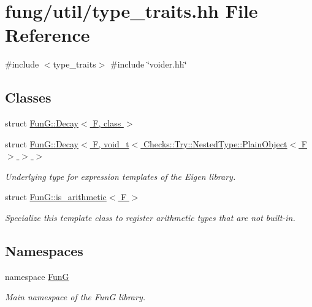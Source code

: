 \hypertarget{type__traits_8hh}{\section{fung/util/type\-\_\-traits.hh \-File \-Reference}
\label{type__traits_8hh}
}
{\ttfamily \#include $<$type\-\_\-traits$>$}\*
{\ttfamily \#include \char`\"{}voider.\-hh\char`\"{}}\*
\subsection*{\-Classes}
\begin{DoxyCompactItemize}
\item 
struct \hyperlink{structFunG_1_1Decay}{\-Fun\-G\-::\-Decay$<$ F, class $>$}
\item 
struct \hyperlink{structFunG_1_1Decay_3_01F_00_01void__t_3_01Checks_1_1Try_1_1NestedType_1_1PlainObject_3_01F_01_4_01_4_01_4}{\-Fun\-G\-::\-Decay$<$ F, void\-\_\-t$<$ Checks\-::\-Try\-::\-Nested\-Type\-::\-Plain\-Object$<$ F $>$ $>$ $>$}
\begin{DoxyCompactList}\small\item\em \-Underlying type for expression templates of the \-Eigen library. \end{DoxyCompactList}\item 
struct \hyperlink{structFunG_1_1is__arithmetic}{\-Fun\-G\-::is\-\_\-arithmetic$<$ F $>$}
\begin{DoxyCompactList}\small\item\em \-Specialize this template class to register arithmetic types that are not built-\/in. \end{DoxyCompactList}\end{DoxyCompactItemize}
\subsection*{\-Namespaces}
\begin{DoxyCompactItemize}
\item 
namespace \hyperlink{namespaceFunG}{\-Fun\-G}
\begin{DoxyCompactList}\small\item\em \-Main namespace of the \-Fun\-G library. \end{DoxyCompactList}\end{DoxyCompactItemize}
